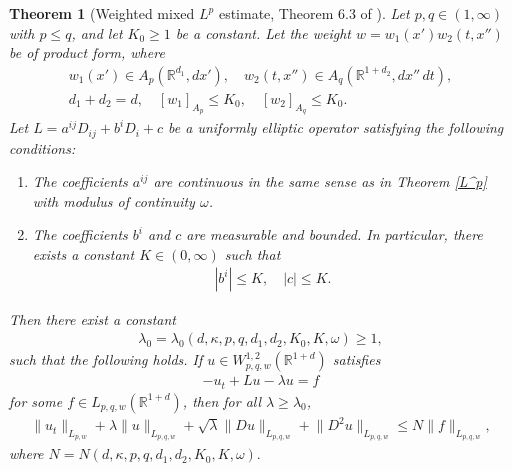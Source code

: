 \documentclass[reqno,11pt,final]{amsart}
\theoremstyle{plain}
\newtheorem{theorem}{Theorem}
\numberwithin{equation}{section}
\numberwithin{theorem}{section}
\begin{document}
\begin{theorem}[Weighted mixed $L^p$ estimate, Theorem 6.3 of {\cite{Ell_Dong_2018}}]\label{Weighted mixed L^p estimate} Let $p,q\in(1,\infty)$ with $p\le q$, and let $K_0\ge1$ be a constant. Let the weight $w=w_1(x')w_2(t,x'')$ be of product form, where
\begin{gather*}
w_1(x')\in A_p(\mathbb{R}^{d_1}, dx'), \quad w_2(t,x'') \in A_q(\mathbb{R}^{1+d_2}, dx''\,dt),\\
d_1 + d_2 = d, \quad [w_1]_{A_p}\le K_0, \quad [w_2]_{A_q} \le K_0.
\end{gather*}Let $L = a^{ij}D_{ij} + b^i D_i + c$ be a uniformly elliptic operator satisfying the following conditions:
\begin{enumerate}[label=(\roman*)]
\item The coefficients $a^{ij}$ are continuous in the same sense as in Theorem \ref{L^p} with modulus of continuity $\omega$.
\item The coefficients $b^i$ and $c$ are measurable and bounded. In particular, there exists a constant $K\in(0,\infty)$ such that
\begin{align*}
|b^i|\le K, \quad |c|\le K.
\end{align*}
\end{enumerate}Then there exist a constant
\begin{gather*}
\lambda_0 = \lambda_0(d,\kappa,p,q,d_1,d_2, K_0,K,\omega)\ge1,
\end{gather*}such that the following holds. If $u\in W_{p,q,w}^{1,2}(\mathbb{R}^{1+d})$ satisfies
\begin{align*}
-u_t + Lu - \lambda u = f
\end{align*}for some  $f\in L_{p,q,w}(\mathbb{R}^{1+d})$, then for all $\lambda\ge\lambda_0$,
\begin{align*}
\lVert u_t\rVert_{L_{p,w}} + \lambda\lVert u\rVert_{L_{p,q,w}} + \sqrt{\lambda}\lVert Du\rVert_{L_{p,q,w}} + \lVert D^2u\rVert_{L_{p,q,w}} \le N\lVert f\rVert_{L_{p,q,w}},
\end{align*}where
$N=N(d,\kappa,p,q,d_1,d_2,K_0,K,\omega).$
\end{theorem}




{}
\end{document}
